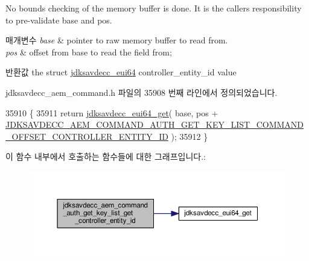 No bounds checking of the memory buffer is done. It is the caller\textquotesingle{}s responsibility to pre-\/validate base and pos.


\begin{DoxyParams}{매개변수}
{\em base} & pointer to raw memory buffer to read from. \\
\hline
{\em pos} & offset from base to read the field from; \\
\hline
\end{DoxyParams}
\begin{DoxyReturn}{반환값}
the struct \hyperlink{structjdksavdecc__eui64}{jdksavdecc\+\_\+eui64} controller\+\_\+entity\+\_\+id value 
\end{DoxyReturn}


jdksavdecc\+\_\+aem\+\_\+command.\+h 파일의 35908 번째 라인에서 정의되었습니다.


\begin{DoxyCode}
35910 \{
35911     \textcolor{keywordflow}{return} \hyperlink{group__eui64_ga2652311a25a6b91cddbed75c108c7031}{jdksavdecc\_eui64\_get}( base, pos + 
      \hyperlink{group__command__auth__get__key__list_gad4af2254ad82f469a714bac04ac96804}{JDKSAVDECC\_AEM\_COMMAND\_AUTH\_GET\_KEY\_LIST\_COMMAND\_OFFSET\_CONTROLLER\_ENTITY\_ID}
       );
35912 \}
\end{DoxyCode}


이 함수 내부에서 호출하는 함수들에 대한 그래프입니다.\+:
\nopagebreak
\begin{figure}[H]
\begin{center}
\leavevmode
\includegraphics[width=350pt]{group__command__auth__get__key__list_gaa74e213019c576b6376cb987af28f0f7_cgraph}
\end{center}
\end{figure}


